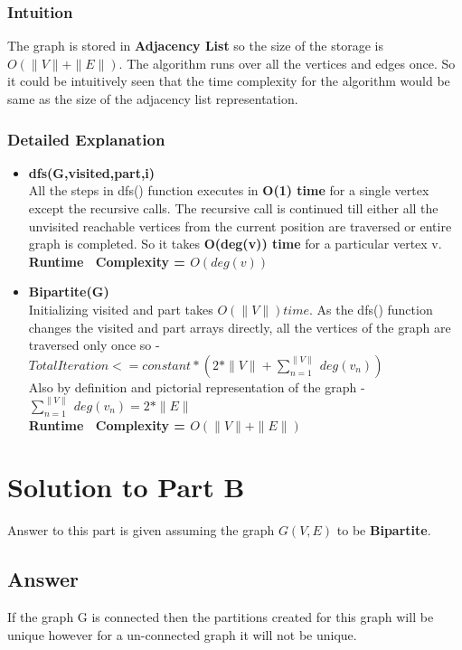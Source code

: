 \documentclass[20pt]{article}
\begin{document}
\subsubsection{Intuition}
The graph is stored in \textbf{Adjacency List} so the size of the storage is \\ 
\textbf{$O(\|V\|+\|E\|)$}. The algorithm runs over all the vertices and edges once. So it could be intuitively seen that the time complexity for the algorithm would be same as the size of the adjacency list representation.
\subsubsection{Detailed Explanation}
\begin{itemize}
\item \textbf{dfs(G,visited,part,i)} \\
All the steps in dfs() function executes in \textbf{O(1) time} for a single vertex except the recursive calls. The recursive call is continued till either all the unvisited reachable vertices from the current position are traversed or entire graph is completed. So it takes \textbf{O(deg(v)) time} for a particular vertex v. \\
\textbf{Runtime ~Complexity = $O(deg(v))$}
\item \textbf{Bipartite(G)} \\
Initializing visited and part takes \textbf{$O(\|V\|) time$}. As the dfs() function changes the visited and part arrays directly, all the vertices of the graph are traversed only once so - \\
$Total Iteration <= constant*(2*\|V\|+\sum_{n=1}^{\|V\|}~deg(v_n))$ \\
Also by definition and pictorial representation of the graph - \\
$\sum_{n=1}^{\|V\|}~deg(v_n) = 2*\|E\| $ \\
\textbf{Runtime ~Complexity = $O(\|V\|+\|E\|)$}
\end{itemize}

\newpage
\section{Solution to Part B}
Answer to this part is given assuming the graph $G(V,E)$ to be \textbf{Bipartite}.
\subsection{Answer}
If the graph G is connected then the partitions created for this graph will be unique however for a un-connected graph it will not be unique.
\end{document}
